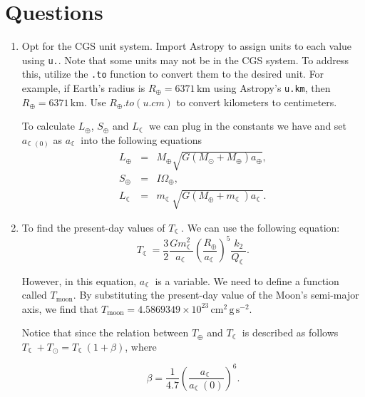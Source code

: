 \documentclass[12pt, letterpaper] {article}
\begin{document}
\section{Questions}
\begin{enumerate}

    \item Opt for the CGS unit system. Import Astropy to assign units to each value using \texttt{u.}. Note that some units may not be in the CGS system. To address this, utilize the \texttt{.to} function to convert them to the desired unit. For example, if Earth's radius is $R_{\oplus} = 6371 \, \text{km}$ using Astropy's \texttt{u.km}, then $R_{\oplus} = 6371 \, \text{km}$. Use \textit{${R_{\oplus}.to(u.cm)}$} to convert kilometers to centimeters.
    \vspace{12pt}

    To calculate $L_\oplus$, $S_\oplus$ and $L_{\leftmoon}$ we can plug in the constants we have and set $a_{\leftmoon(0)}$ as $a_{\leftmoon}$  into the following equations
    \begin{eqnarray}
        L_\oplus &=& M_\oplus\sqrt{G(M_\odot + M_\oplus) a_\oplus},\\
        S_\oplus &=& I\Omega_\oplus,\\
        L_{\leftmoon} &=& m_{\leftmoon}\sqrt{G(M_\oplus+m_{\leftmoon})
        a_{\leftmoon}}.
    \end{eqnarray}

    \item To find the present-day values of $T_{\leftmoon}$.  We can use the following equation:
    \begin{equation}
        T_{\leftmoon} = \frac{3}{2}\frac{G m^2_{\leftmoon}}{a_{\leftmoon}}\left(\frac{R_\oplus}{a_{\leftmoon}}\right)^5
        \frac{k_2}{Q_{\leftmoon}}.
    \end{equation}
    
    However, in this equation, $a_{\leftmoon}$ is a variable. We need to define a function called $T_{\text{moon}}$. By substituting the present-day value of the Moon's semi-major axis, we find that $T_{\text{moon}} = 4.5869349 \times 10^{23} \, \text{cm}^2 \, \text{g} \, \text{s}^{-2}$.
    \vspace{12pt}
    
    Notice that since the relation between $T_\oplus$ and $T_{\leftmoon}$ is described as follows  
    $T_{\leftmoon}+T_\odot=T_{\leftmoon}(1+\beta)$, where
    
    \begin{equation}
        \beta = \frac{1}{4.7}  \left(\frac{a_{\leftmoon}}{a_{\leftmoon}(0)}\right)^6.
    \end{equation}
    

\end{enumerate}
\end{document}
